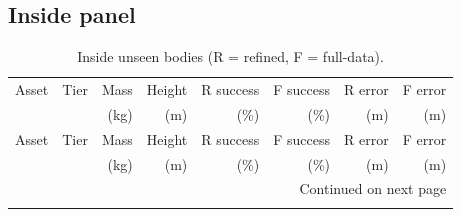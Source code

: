 \subsection{Inside panel}
\begingroup\scriptsize
\setlength{\tabcolsep}{4pt}
\begin{longtable}{lrrrrrrr}
\caption{Inside unseen bodies (R = refined, F = full-data).}\label{tab:all_inside}\\
\toprule
Asset & Tier & Mass & Height & R success & F success & R error & F error \\
 & & (kg) & (m) & (\%) & (\%) & (m) & (m) \\
\midrule\endfirsthead
\toprule
Asset & Tier & Mass & Height & R success & F success & R error & F error \\
 & & (kg) & (m) & (\%) & (\%) & (m) & (m) \\
\midrule\endhead
\midrule\multicolumn{8}{r}{Continued on next page}\\\endfoot
\bottomrule\endlastfoot


\end{longtable}
